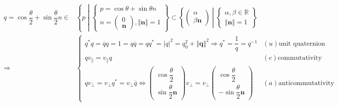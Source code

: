 \documentclass[
]{book}
\theoremstyle{definition}
\theoremstyle{definition}
\theoremstyle{definition}
\theoremstyle{definition}
\theoremstyle{remark}
\begin{document}
\[
\begin{aligned}
q=\cos\dfrac{\theta}{2}+\sin\dfrac{\theta}{2}n\in & \left\{ p\middle|\begin{cases}
p=\cos\theta+\sin\theta n\\
n=\begin{pmatrix}0\\
\boldsymbol{n}
\end{pmatrix},\left\Vert \boldsymbol{n}\right\Vert =1
\end{cases}\right\} \subset\left\{ \begin{pmatrix}\alpha\\
\beta\boldsymbol{n}
\end{pmatrix}\middle|\begin{cases}
\alpha,\beta\in\mathbb{R}\\
\left\Vert \boldsymbol{n}\right\Vert =1
\end{cases}\right\} \\
\Rightarrow & \begin{cases}
q^{*}q=\overline{q}q=1=q\overline{q}=qq^{*}=\left|q\right|^{2}=q_{{\scriptscriptstyle 0}}^{2}+\left\Vert \boldsymbol{q}\right\Vert ^{2}\Rightarrow q^{*}=\dfrac{1}{q}=q^{-1} & \left(u\right)\text{unit quaternion}\\
qv_{{\scriptscriptstyle \parallel}}=v_{{\scriptscriptstyle \parallel}}q & \left(c\right)\text{commutativity}\\
qv_{{\scriptscriptstyle \perp}}=v_{{\scriptscriptstyle \perp}}q^{*}=v_{{\scriptscriptstyle \perp}}\overline{q}\Leftrightarrow\begin{pmatrix}\cos\dfrac{\theta}{2}\\
\sin\dfrac{\theta}{2}\boldsymbol{n}
\end{pmatrix}v_{{\scriptscriptstyle \perp}}=v_{{\scriptscriptstyle \perp}}\begin{pmatrix}\cos\dfrac{\theta}{2}\\
-\sin\dfrac{\theta}{2}\boldsymbol{n}
\end{pmatrix} & \left(a\right)\text{anticommutativity}
\end{cases}
\end{aligned}
\]
\end{document}
